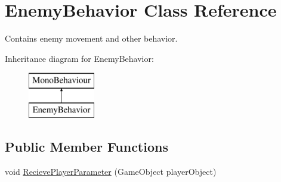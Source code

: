 \hypertarget{class_enemy_behavior}{}\section{Enemy\+Behavior Class Reference}
\label{class_enemy_behavior}


Contains enemy movement and other behavior.  


Inheritance diagram for Enemy\+Behavior\+:\begin{figure}[H]
\begin{center}
\leavevmode
\includegraphics[height=2.000000cm]{class_enemy_behavior}
\end{center}
\end{figure}
\subsection*{Public Member Functions}
\begin{DoxyCompactItemize}
\item 
void \mbox{\hyperlink{class_enemy_behavior_a1a0d6efe8ce9e53a0e4bddd06c379097}{Recieve\+Player\+Parameter}} (Game\+Object player\+Object)
\end{DoxyCompactItemize}
